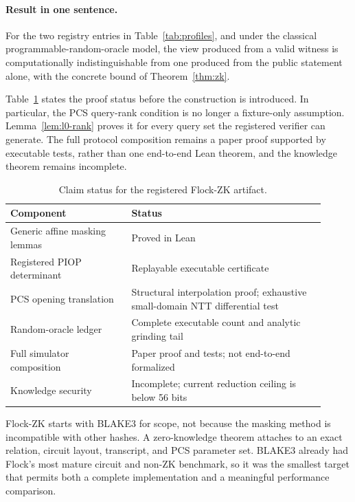 \documentclass[11pt]{article}
\theoremstyle{definition}
\begin{document}
\paragraph{Result in one sentence.}
For the two registry entries in Table~\ref{tab:profiles}, and under the
classical programmable-random-oracle model, the view produced from a valid
witness is computationally indistinguishable from one produced from the public
statement alone, with the concrete bound of Theorem~\ref{thm:zk}.

Table~\ref{tab:claim-status} states the proof status before the construction is
introduced.  In particular, the PCS query-rank condition is no longer a
fixture-only assumption.  Lemma~\ref{lem:l0-rank} proves it for every query set
the registered verifier can generate.  The full protocol composition remains a
paper proof supported by executable tests, rather than one end-to-end Lean
theorem, and the knowledge theorem remains incomplete.

\begin{table}[ht]
\centering\small
\caption{Claim status for the registered Flock-ZK artifact.}
\label{tab:claim-status}
\begin{tabular}{@{}>{\raggedright\arraybackslash}p{0.35\linewidth}
                  >{\raggedright\arraybackslash}p{0.56\linewidth}@{}}
\toprule
Component & Status \\
\midrule
Generic affine masking lemmas & Proved in Lean \\
Registered PIOP determinant & Replayable executable certificate \\
PCS opening translation & Structural interpolation proof; exhaustive small-domain NTT differential test \\
Random-oracle ledger & Complete executable count and analytic grinding tail \\
Full simulator composition & Paper proof and tests; not end-to-end formalized \\
Knowledge security & Incomplete; current reduction ceiling is below 56 bits \\
\bottomrule
\end{tabular}
\end{table}

Flock-ZK starts with BLAKE3 for scope, not because the masking method is
incompatible with other hashes.  A zero-knowledge theorem attaches to an exact
relation, circuit layout, transcript, and PCS parameter set.  BLAKE3 already had
Flock's most mature circuit and non-ZK benchmark, so it was the smallest target
that permits both a complete implementation and a meaningful performance
comparison.
\end{document}
